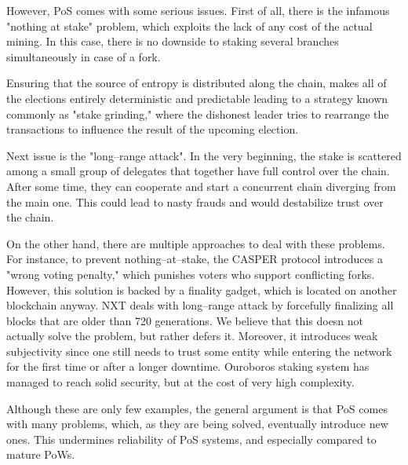 However, PoS comes with some serious issues. First of all, there is the infamous
"nothing at stake"\cite{pos_flaws_nothing} problem, which exploits the lack of
any cost of the actual mining. In this case, there is no downside to staking
several branches simultaneously in case of a fork.

Ensuring that the source of entropy is distributed along the chain, makes all of
the elections entirely deterministic and predictable leading to a strategy known
commonly as "stake grinding," where the dishonest leader tries to rearrange the
transactions to influence the result of the upcoming election.

Next issue is the "long–range attack"\cite{pos_flaws_long}. In the very
beginning, the stake is scattered among a small group of delegates that together
have full control over the chain. After some time, they can cooperate and start
a concurrent chain diverging from the main one. This could lead to nasty frauds
and would destabilize trust over the chain.

On the other hand, there are multiple approaches to deal with these problems.
For instance, to prevent nothing–at–stake, the CASPER protocol introduces a
"wrong voting penalty," which punishes voters who support conflicting
forks\cite{casper}. However, this solution is backed by a finality gadget, which
is located on another blockchain anyway. NXT deals with long–range attack by
forcefully finalizing all blocks that are older than 720 generations\cite{nxt}.
We believe that this doesn not actually solve the problem, but rather defers it.
Moreover, it introduces weak subjectivity since one still needs to trust some
entity while entering the network for the first time or after a longer downtime.
Ouroboros staking system has managed to reach solid security, but at the cost of
very high complexity\cite{ouroboros}.

Although these are only few examples, the general argument is that PoS comes
with many problems, which, as they are being solved, eventually introduce new
ones. This undermines reliability of PoS systems, and especially compared to
mature PoWs.
